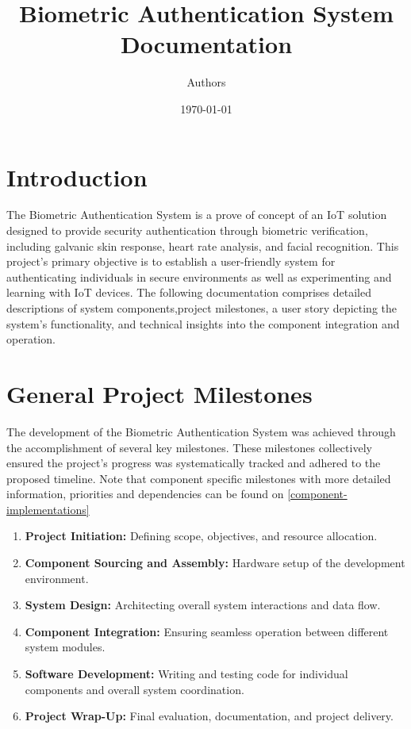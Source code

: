 \documentclass{article}
\title{Biometric Authentication System Documentation} \author{Authors}
\date{\today}
\begin{document}
\maketitle

\section{Introduction} The Biometric Authentication System is a prove of concept of an IoT
solution designed to provide security authentication through biometric verification, including
galvanic skin response, heart rate analysis, and facial recognition. This
project's primary objective is to establish a user-friendly system
for authenticating individuals in secure environments as well as experimenting and learning with IoT devices. The following
documentation comprises detailed descriptions of system components,project milestones, a user story depicting the system's functionality, and
technical insights into the component integration and operation.

\section{General Project Milestones} The development of the Biometric
Authentication System was achieved through the accomplishment of several key
milestones. These milestones collectively ensured the project's progress was
systematically tracked and adhered to the proposed timeline. Note that component specific milestones with more
detailed information, priorities and dependencies can be found on \autoref{component-implementations}

\begin{enumerate} 
    \item \textbf{Project Initiation:} Defining scope, objectives,
and resource allocation. 
\item \textbf{Component Sourcing and Assembly:} Hardware setup of the development environment. 
\item \textbf{System Design:} Architecting overall system interactions and data flow.
\item \textbf{Component Integration:} Ensuring seamless operation between
different system modules. 
\item \textbf{Software Development:} Writing and
testing code for individual components and overall system coordination. 
\item \textbf{Project Wrap-Up:} Final evaluation, documentation,
and project delivery. 
\end{enumerate}
\end{document}
